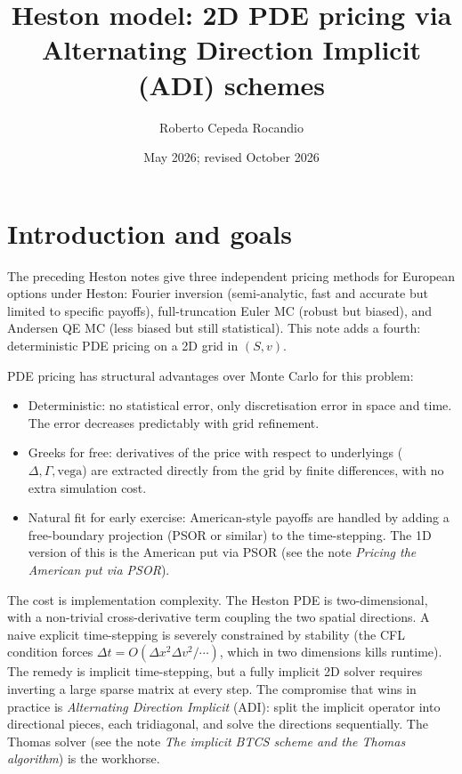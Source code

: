 \documentclass[11pt]{article}
\title{Heston model: 2D PDE pricing via Alternating Direction Implicit (ADI) schemes}
\author{Roberto Cepeda Rocandio}
\date{May 2026; revised October 2026}
\theoremstyle{plain}
\theoremstyle{definition}
\theoremstyle{remark}
\begin{document}
\maketitle
\tableofcontents
\bigskip

\section{Introduction and goals}

The preceding Heston notes give three independent pricing methods for European options under Heston: Fourier inversion (semi-analytic, fast and accurate but limited to specific payoffs), full-truncation Euler MC (robust but biased), and Andersen QE MC (less biased but still statistical). This note adds a fourth: deterministic PDE pricing on a 2D grid in $(S, v)$.

PDE pricing has structural advantages over Monte Carlo for this problem:
\begin{itemize}[topsep=2pt]
    \item Deterministic: no statistical error, only discretisation error in space and time. The error decreases predictably with grid refinement.
    \item Greeks for free: derivatives of the price with respect to underlyings ($\Delta, \Gamma, \mathrm{vega}$) are extracted directly from the grid by finite differences, with no extra simulation cost.
    \item Natural fit for early exercise: American-style payoffs are handled by adding a free-boundary projection (PSOR or similar) to the time-stepping. The 1D version of this is the American put via PSOR (see the note \emph{Pricing the American put via PSOR}).
\end{itemize}
The cost is implementation complexity. The Heston PDE is two-dimensional, with a non-trivial cross-derivative term coupling the two spatial directions. A naive explicit time-stepping is severely constrained by stability (the CFL condition forces $\Delta t = O(\Delta x^2 \Delta v^2 / \cdots)$, which in two dimensions kills runtime). The remedy is implicit time-stepping, but a fully implicit 2D solver requires inverting a large sparse matrix at every step. The compromise that wins in practice is \emph{Alternating Direction Implicit} (ADI): split the implicit operator into directional pieces, each tridiagonal, and solve the directions sequentially. The Thomas solver (see the note \emph{The implicit BTCS scheme and the Thomas algorithm}) is the workhorse.
\end{document}
